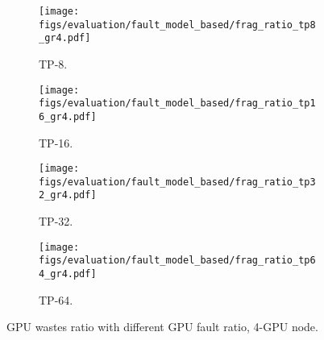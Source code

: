 \begin{figure*}[h!t]
    \centering
    \begin{subfigure}[b]{0.23\linewidth}
        \centering
        \texttt{[image: figs/evaluation/fault\_model\_based/frag\_ratio\_tp8\_gr4.pdf]}
        \caption{TP-8.}
        \label{fig:simulation:model:wasted:tp8}
    \end{subfigure}
    \hspace{2pt}
    \begin{subfigure}[b]{0.23\linewidth}
        \centering
        \texttt{[image: figs/evaluation/fault\_model\_based/frag\_ratio\_tp16\_gr4.pdf]}
        \caption{TP-16.}
        \label{fig:simulation:model:wasted:tp16}
    \end{subfigure}
    \hspace{2pt}
    \begin{subfigure}[b]{0.23\linewidth}
        \centering
        \texttt{[image: figs/evaluation/fault\_model\_based/frag\_ratio\_tp32\_gr4.pdf]}
        \caption{TP-32.}
        \label{fig:simulation:model:wasted:tp32}
    \end{subfigure}
    \hspace{2pt}
    \begin{subfigure}[b]{0.23\linewidth}
        \centering
        \texttt{[image: figs/evaluation/fault\_model\_based/frag\_ratio\_tp64\_gr4.pdf]}
        \caption{TP-64.}
        \label{fig:simulation:model:wasted:tp64}
    \end{subfigure}
    \vspace{-1ex}
    \caption{GPU wastes ratio with different GPU fault ratio, 4-GPU node.}
    \label{fig:simulation:model:wasted-gr4}
\end{figure*}



